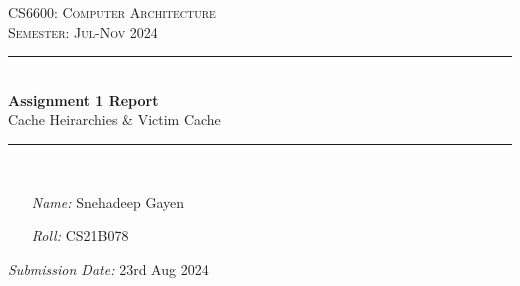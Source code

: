 \thispagestyle{empty} %
\begin{titlepage}
\begin{center}
	\doublespacing %
	\textsc{\huge CS6600: Computer Architecture}\\
	\vspace{2.0cm} %
	\onehalfspacing
	\textsc{\Large Semester: Jul-Nov 2024}\\
	\vspace{1.0cm}
	
	\rule{\linewidth}{0.5mm}\\ %
	\vspace{1.4cm}
	\huge \textbf{Assignment 1 Report}\\ %
	\vspace{1cm}
	\large Cache Heirarchies \& Victim Cache \normalsize
	\vspace{0.3cm}
	\rule{\linewidth}{0.5mm}\\
	\vspace{2.4cm}
\end{center}

\onehalfspacing

\begin{minipage}[t]{0.8\textwidth}
	\begin{itemize}
	\item[\emph{Name:}] Snehadeep Gayen
	\item[\emph{Roll:}] CS21B078
	\end{itemize}
\end{minipage}

\vspace{2.9cm}

\flushright \emph{Submission Date:} 23rd Aug 2024
\end{titlepage}
\restoregeometry

\onehalfspacing